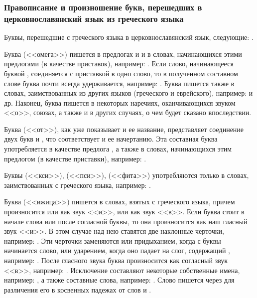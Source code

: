 \documentclass[11pt,a4paper,oneside]{memoir}
\begin{document}
                \subsubsection{Правописание и произношение букв, перешедших в церковнославянский язык из греческого языка}

    Буквы, перешедшие с греческого языка в церковнославянский язык, следующие: {}.

    Буква {} (<<омега>>) пишется в предлогах {} и {} и в словах, начинающихся этими предлогами (в качестве приставок), например: {}. Если слово, начинающееся буквой {}, соединяется с приставкой в одно слово, то в полученном составном слове буква {} почти всегда удерживается, например: {}. Буква {} пишется также в словах, заимствованных из других языков (греческого и еврейского), например: {} и др. Наконец, буква {} пишется в некоторых наречиях, оканчивающихся звуком <<о>>, союзах, а также и в других случаях, о чем будет сказано впоследствии.

    Буква {} (<<от>>), как уже показывает и ее название, представляет соединение двух букв {} и {}, что соответствует и ее начертанию. Эта составная буква употребляется в качестве предлога {}, а также в словах, начинающихся этим предлогом (в качестве приставки), например: {}.

    Буквы {} (<<кси>>), {} (<<пси>>), {} (<<фита>>) употребляются только в словах, заимствованных с греческого языка, например: {}.

    Буква {} (<<ижица>>) пишется в словах, взятых с греческого языка, причем произносится или как звук <<и>>, или как звук <<в>>. Если буква {} стоит в начале слова или после согласной буквы, то она произносится как наш гласный звук <<и>>. В этом случае над нею ставятся две наклонные черточки, например: {}. Эти черточки заменяются или придыханием, когда с буквы {} начинается слово, или ударением, когда оно падает на слог, содержащий {}, например: {}. После гласного звука буква {} произносится как согласный звук <<в>>, например: {}. Исключение составляют некоторые собственные имена, например: {}, а также составные слова, например: {}. Слово {} пишется через {} для различения его в косвенных падежах от слов {} и {}.
\end{document}
